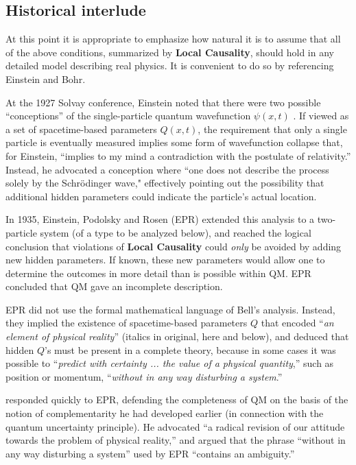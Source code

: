 \documentclass[onecolumn, nofootinbib, 12pt]{revtex4-1}
\begin{document}
\subsection{Historical interlude}
\label{sec:interlude}

At this point it is appropriate to emphasize how natural it is to assume that all of the above conditions, summarized by {\bf Local Causality}, should hold in any detailed model describing real physics.  It is convenient to do so by referencing Einstein and Bohr.

At the 1927 Solvay conference, Einstein noted that there were two possible ``conceptions'' of the single-particle quantum wavefunction $\psi(x,t)$ \cite{bacciagaluppi2009}. If viewed as a set of spacetime-based parameters $Q(x,t)$, the requirement that only a single particle is eventually measured implies some form of wavefunction collapse that, for Einstein, ``implies to my mind a contradiction with the postulate of relativity.''  Instead, he advocated a conception where ``one does not describe the process solely by the Schr\"odinger wave," effectively pointing out the possibility that additional hidden parameters could indicate the particle's actual location.

In 1935, Einstein, Podolsky and Rosen \nocite{EPR1935} (EPR) extended this analysis to a two-particle system (of a type to be analyzed below), and reached the logical conclusion that violations of {\bf Local Causality} could \emph{only} be avoided by adding new hidden parameters.  If known, these new parameters would allow one to determine the outcomes in more detail than is possible within QM\@.  EPR concluded that QM gave an incomplete description.

EPR did not use the formal mathematical language of Bell's analysis.  Instead, they implied the existence of spacetime-based parameters $Q$ that encoded ``{\it an element of physical reality}'' (italics in original, here and below), and deduced that hidden $Q$'s must be present in a complete theory, because in some cases it was possible to ``{\it predict with certainty ... the value of a physical quantity},'' such as position or momentum, ``{\it without in any way disturbing a system}.''  

\textcite{bohr1935} responded quickly to EPR, defending the completeness of QM on the basis of the notion of complementarity he had developed earlier (in connection with the quantum uncertainty principle).  He advocated ``a radical revision of our attitude towards the problem of physical reality,'' and argued that the phrase ``without in any way disturbing a system'' used by EPR ``contains an ambiguity.''   
\end{document}
